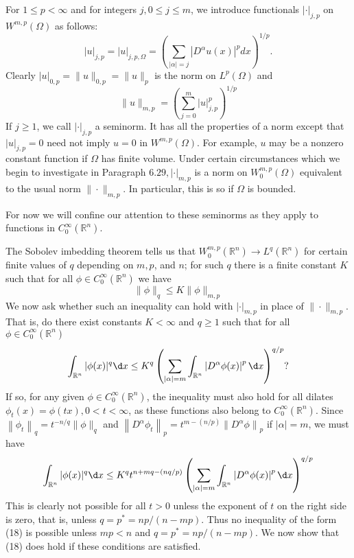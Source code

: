 \begin{para}[Seminorms]
  For $1 \leq p<\infty$ and for integers $j, 0 \leq j \leq m$, we introduce functionals $|\cdot|_{j, p}$ on $W^{m,p}(\Omega)$ as follows:
  \[
  |u|_{j, p}=|u|_{j, p, \Omega}=\left(\sum_{|\alpha|=j}\left|D^\alpha u(x)\right|^p d x\right)^{1 / p} .
  \]
  Clearly $|u|_{0, p}=\|u\|_{0, p}=\|u\|_p$ is the norm on $L^p(\Omega)$ and
  \[
  \|u\|_{m,p}=\left(\sum_{j=0}^m|u|_{j, p}^p\right)^{1 / p}
  \]
  If $j \geq 1$, we call $|\cdot|_{j, p}$ a seminorm. It has all the properties of a norm except that $|u|_{j, p}=0$ need not imply $u=0$ in $W^{m,p}(\Omega)$. For example, $u$ may be a nonzero constant function if $\Omega$ has finite volume. Under certain circumstances which we begin to investigate in Paragraph $6.29,|\cdot|_{m,p}$ is a norm on $W_0^{m, p}(\Omega)$ equivalent to the usual norm $\|\cdot\|_{m,p}$. In particular, this is so if $\Omega$ is bounded.

  For now we will confine our attention to these seminorms as they apply to functions in $C_0^{\infty}\left(\mathbb{R}^n\right)$.
\end{para}


\begin{para}
  The Sobolev imbedding theorem tells us that $W_0^{m, p}\left(\mathbb{R}^n\right) \rightarrow L^q\left(\mathbb{R}^n\right)$ for certain finite values of $q$ depending on $m, p$, and $n$; for such $q$ there is a finite constant $K$ such that for all $\phi \in C_0^{\infty}\left(\mathbb{R}^n\right)$ we have
  \[
  \|\phi\|_q \leq K\|\phi\|_{m,p}
  \]
  We now ask whether such an inequality can hold with $|\cdot|_{m,p}$ in place of $\|\cdot\|_{m,p}$. That is, do there exist constants $K<\infty$ and $q \geq 1$ such that for all $\phi \in C_0^{\infty}\left(\mathbb{R}^n\right)$
  \[
  \int_{\mathbb{R}^n}|\phi(x)|^q \d x \leq K^q\left(\sum_{|\alpha|=m} \int_{\mathbb{R}^n}\left|D^\alpha \phi(x)\right|^p \d x\right)^{q / p} ?
  \]
  If so, for any given $\phi \in C_0^{\infty}\left(\mathbb{R}^n\right)$, the inequality must also hold
  for all dilates $\phi_t(x)=\phi(t x), 0<t<\infty$, as these functions also belong
  to $C_0^{\infty}\left(\mathbb{R}^n\right)$. Since $\left\|\phi_t\right\|_q=t^{-n / q}\|\phi\|_q$
  and $\left\|D^\alpha \phi_t\right\|_p=t^{m-(n / p)}\left\|D^\alpha \phi\right\|_p$ if $|\alpha|=m$,
  we must have
  \[
  \int_{\mathbb{R}^n}|\phi(x)|^q \d x \leq K^q t^{n+m q-(n q / p)}\left(\sum_{|\alpha|=m} \int_{\mathbb{R}^n}\left|D^\alpha \phi(x)\right|^p \d x\right)^{q / p}
  \]
  This is clearly not possible for all $t>0$ unless the exponent of $t$ on the right side is zero,
  that is, unless $q=p^*=n p /(n-m p)$. Thus no inequality of the form (18) is possible unless $m p<n$
  and $q=p^*=n p /(n-m p)$. We now show that (18) does hold if these conditions are satisfied.
\end{para}


